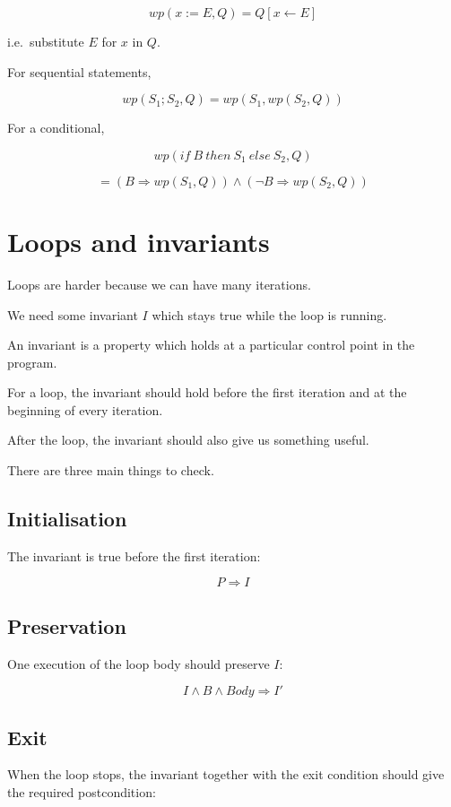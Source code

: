 \documentclass[11pt]{book}
\begin{document}
\[
wp(x:=E,Q)=Q[x\leftarrow E]
\]

i.e.\ substitute $E$ for $x$ in $Q$.

For sequential statements,

\[
wp(S_1;S_2,Q)
=
wp(S_1,wp(S_2,Q))
\]

For a conditional,

\[
wp(if\ B\ then\ S_1\ else\ S_2,Q)
\]

\[
=
(B\Rightarrow wp(S_1,Q))
\land
(\neg B\Rightarrow wp(S_2,Q))
\]

\section{Loops and invariants}

Loops are harder because we can have many iterations.

We need some invariant $I$ which stays true while
the loop is running.

\begin{ppdefn}
An invariant is a property which holds at a particular
control point in the program.

For a loop, the invariant should hold before the first
iteration and at the beginning of every iteration.
\end{ppdefn}

After the loop, the invariant should also give us
something useful.

There are three main things to check.

\subsection{Initialisation}

The invariant is true before the first iteration:

\[
P\Rightarrow I
\]

\subsection{Preservation}

One execution of the loop body should preserve $I$:

\[
I\land B\land Body \Rightarrow I'
\]

\subsection{Exit}

When the loop stops, the invariant together with the
exit condition should give the required postcondition:
\end{document}
